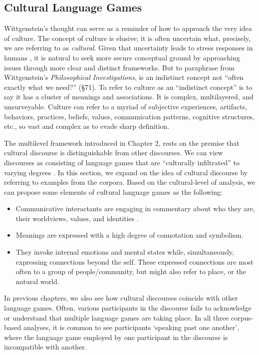 \subsection{Cultural Language Games}

Wittgenstein's thought can serve as a reminder of how to approach the very idea of culture. The concept of culture is elusive; it is often uncertain what, precisely, we are referring to as \textit{cultural}. Given that uncertainty leads to stress responses in humans \citep{DeBerker2016}, it is natural to seek more secure conceptual ground by approaching issues through more clear and distinct frameworks. But to paraphrase from Wittgenstein's \textit{Philosophical Investigations}, is an indistinct concept not ``often exactly what we need?'' (\S 71). To refer to culture as an ``indistinct concept'' is to say it has a cluster of meanings and associations. It is complex, multilayered, and unsurveyable. Culture can refer to a myriad of subjective experiences, artifacts, behaviors, practices, beliefs, values, communication patterns, cognitive structures, etc., so vast and complex as to evade sharp definition.

The multilevel framework introduced in Chapter 2, rests on the premise that cultural discourse is distinguishable from other discourses. We can view discourses as consisting of language games that are ``culturally infiltrated'' to varying degrees \citep[5]{Shi-xu2005a}. In this section, we expand on the idea of cultural discourse by referring to examples from the corpora. Based on the cultural-level of analysis, we can propose some elements of cultural language games as the following: 

\begin{itemize}
    \item Communicative interactants are engaging in commentary about who they are, their worldviews, values, and identities  \citep[see][]{Carbaugh2007a}.
    \item Meanings are expressed with a high degree of connotation and symbolism. 
    \item They invoke internal emotions and mental states while, simultaneously, expressing connections beyond the self. These expressed connections are most often to a group of people/community, but might also refer to place, or the natural world.  
\end{itemize}

In previous chapters, we also see how cultural discourses coincide with other language games. Often, various participants in the discourse fails to acknowledge or understand that multiple language games are taking place. In all three corpus-based analyses, it is common to see participants `speaking past one another', where the language game employed by one participant in the discourse is incompatible with another.  

